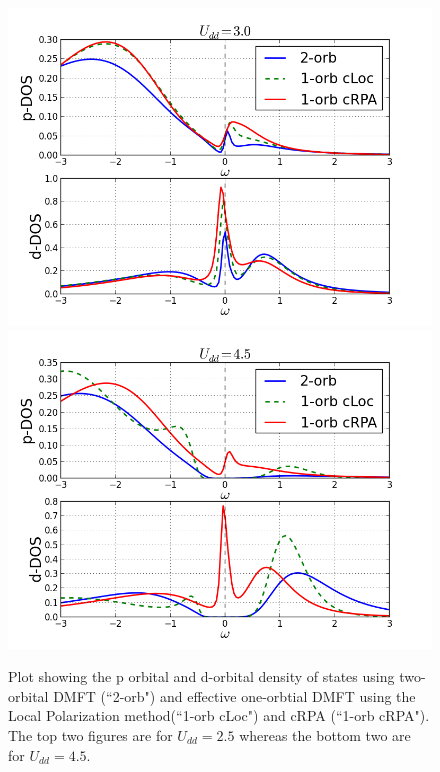 \documentclass[10pt]{ruthesis}
\begin{document}
{\begin{figure}[th]
 \includegraphics[width=\columnwidth]{./plotForpublishing/pddoscmpUdd3_locW.png}
 \includegraphics[width=\columnwidth]{./plotForpublishing/pddoscmpUdd4p5_locW.png}
 \caption{\label{fig8}Plot showing the p orbital and d-orbital density of states using two-orbital DMFT (``2-orb") and  effective one-orbtial DMFT using the Local Polarization method(``1-orb cLoc") and cRPA (``1-orb cRPA"). The top two figures are for $U_{dd}=2.5$ whereas the bottom two are for $U_{dd}=4.5$.  }
\end{figure}

}
\end{document}
